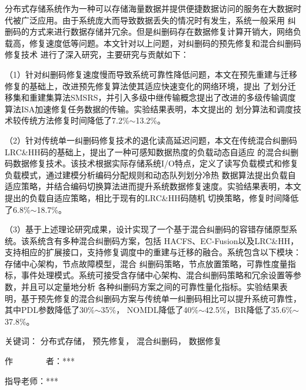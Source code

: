 
\begin{cabstract}
	分布式存储系统作为一种可以存储海量数据并提供便捷数据访问的服务在大数据时代被广泛应用。由于系统庞大而导致数据丢失的情况时有发生，系统一般采用
	纠删码的方式来进行数据存储并冗余。但是纠删码存在数据修复计算开销大，网络负载高，修复速度低等问题。本文针对以上问题，对纠删码的预先修复和混合纠删码修复技术
	进行了深入研究，主要研究与贡献如下：
	
	（1）针对纠删码修复速度慢而导致系统可靠性降低问题，本文在预先重建与迁移修复的基础上，改进预先修复算法使其适应快速变化的网络环境，提出
	了划分迁移集和重建集算法SMSRS，并引入多级中继传输概念提出了改进的多级传输调度算法ISA加速修复任务数据的传输。实验结果表明，本文提出的
	划分算法和调度技术较传统方法修复时间降低了7.2\%$\sim$13.2\%。

	（2）针对传统单一纠删码修复技术的退化读高延迟问题，本文在传统混合纠删码LRC\&HH码的基础上，提出了一种可感知数据热度的负载动态自适应
	的混合纠删码数据修复技术。该技术根据实际存储系统I/O特点，定义了读写负载模式和修复负载模式，通过建模分析编码分配规则和动态队列划分冷热
	数据算法提出负载自适应策略，并结合编码切换算法进而提升系统数据修复速度。实验结果表明，本文提出的负载自适应策略，相比于现有的LRC\&HH码随机
	切换策略，修复时间降低了6.8\%$\sim$18.7\%。

	（3）基于上述理论研究成果，设计实现了一个基于混合纠删码的容错存储原型系统。该系统含有多种混合纠删码方案，包括
	HACFS、EC-Fusion以及LRC\&HH，支持相应的扩展接口，支持修复调度中的重建与迁移的融合。系统包含以下模块：存储中心架构，节点故障模型，混合
	纠删码策略，节点放置策略，可靠性度量指标，事件处理模式。系统可接受含存储中心架构、混合纠删码策略和冗余设置等参数，并且可以定量地分析
	各种纠删码方案之间的可靠性量化指标。实验结果表明，基于预先修复的混合纠删码方案与传统单一纠删码相比可以提升系统可靠性，其中PDL参数降低了30\%$\sim$35\%，
	NOMDL降低了40\%$\sim$42.5\%，BR降低了35.6\%$\sim$37.8\%。
	
	\vskip 21bp
	\noindent
	{\heiti{} 关键词：}
	分布式存储，
	预先修复，
	混合纠删码，
	数据修复
	
	\begin{flushright}
		
		作~~~~~~~~者：***
		
		指导老师：***
		
	\end{flushright}
\end{cabstract}


